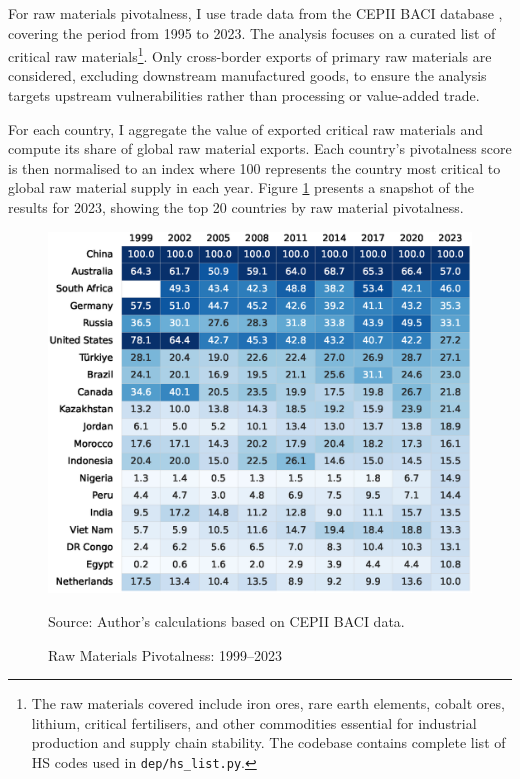 \documentclass[11pt]{article}
\begin{document}
For raw materials pivotalness, I use trade data from the CEPII BACI database \citep{baci2023}, covering the period from 1995 to 2023. The analysis focuses on a curated list of critical raw materials\footnote{The raw materials covered include iron ores, rare earth elements, cobalt ores, lithium, critical fertilisers, and other commodities essential for industrial production and supply chain stability. The codebase contains complete list of HS codes used in \texttt{dep/hs\_list.py}.}. Only cross-border exports of primary raw materials are considered, excluding downstream manufactured goods, to ensure the analysis targets upstream vulnerabilities rather than processing or value-added trade.

For each country, I aggregate the value of exported critical raw materials and compute its share of global raw material exports. Each country’s pivotalness score is then normalised to an index where 100 represents the country most critical to global raw material supply in each year. Figure \ref{fig:pivotal_raw} presents a snapshot of the results for 2023, showing the top 20 countries by raw material pivotalness.

\begin{figure}[H]
	\caption{Raw Materials Pivotalness: 1999–2023}
	\label{fig:pivotal_raw}
	\centering
        \phantom{a}
	\includegraphics[width=\textwidth]{dataviz/results_pivotal1_snapshot.eps}

	{\footnotesize Source: Author's calculations based on CEPII BACI data.}
\end{figure}
\end{document}
